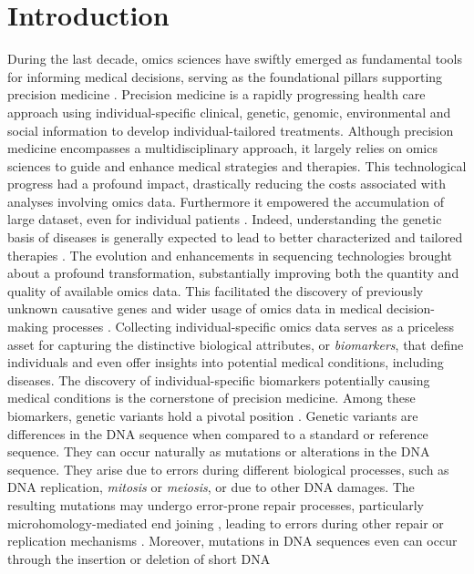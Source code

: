 \documentclass[a4paper, titlepage, openright]{book}
\newcommand{\mychapter}[2]{
    \setcounter{chapter}{#1}
    \setcounter{section}{0}
    \chapter*{#2}
    \addcontentsline{toc}{chapter}{#2}
}
\begin{document}
\begin{frontespizio}
\end{frontespizio}
\tableofcontents
\listoffigures
\listoftables
\mychapter{1}{Introduction}
During the last decade, omics sciences have swiftly emerged as fundamental tools for informing medical decisions, serving as the foundational pillars supporting precision medicine \citep{ginsburg2009genomic}. Precision medicine is a rapidly progressing health care approach using individual-specific clinical, genetic, genomic, environmental and social information \citep{ginsburg2009genomic} to develop individual-tailored treatments. Although precision medicine encompasses a multidisciplinary approach, it largely relies on omics sciences to guide and enhance medical strategies and therapies. This technological progress had a profound impact, drastically reducing the costs associated with analyses involving omics data. Furthermore it empowered the accumulation of large dataset, even for individual patients \citep{voelkerding2009next}. Indeed, understanding the genetic basis of diseases is generally expected to lead to better characterized and tailored therapies \citep{ashley2016towards}. The evolution and enhancements in sequencing technologies brought about a profound transformation, substantially improving both the quantity and quality of available omics data. This facilitated the discovery of previously unknown causative genes \citep{ng2009targeted} and wider usage of omics data in medical decision-making processes \citep{ashley2010clinical, worthey2011making}. Collecting individual-specific omics data serves as a priceless asset for capturing the distinctive biological attributes, or \emph{biomarkers}, that define individuals and even offer insights into potential medical conditions, including diseases. The discovery of individual-specific biomarkers potentially causing medical conditions is the cornerstone of precision medicine. Among these biomarkers, genetic variants hold a pivotal position \citep{raphael2014identifying}. Genetic variants are differences in the DNA sequence when compared to a standard or reference sequence. They can occur naturally as mutations or alterations in the DNA sequence. They arise due to errors during different biological processes, such as DNA replication, \emph{mitosis} or \emph{meiosis}, or due to other DNA damages. The resulting mutations may undergo error-prone repair processes, particularly microhomology-mediated end joining \citep{sinha2017microhomology, seol2018microhomology}, leading to errors during other repair or replication mechanisms \citep{rodgers2016error}. Moreover, mutations in DNA sequences even can occur through the insertion or deletion of short DNA 
\end{document}
